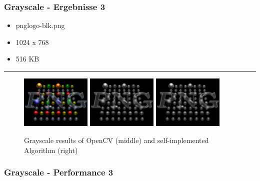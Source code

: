 \begin{frame}
    \frametitle{Grayscale - Ergebnisse 3}

    \begin{itemize}
        \item pnglogo-blk.png
        \item 1024 x 768
        \item 516 KB
    \end{itemize}

    \hfill
    \hrule
    \hfill

    \begin{figure}[H]
        \centering
    
        \includegraphics[width=0.30\textwidth]{images/pnglogo-blk.png}
        \includegraphics[width=0.30\textwidth]{images/results/grayscale-cv.pnglogo-blk.png}
        \includegraphics[width=0.30\textwidth]{images/results/grayscale-my.pnglogo-blk.png}

        
        \begin{center}
            \caption{Grayscale results of OpenCV (middle) and self-implemented  Algorithm (right)}            
        \end{center}

        \label{fig:grayscale3}
    \end{figure}
\end{frame}

\begin{frame}
    \frametitle{Grayscale - Performance 3}

    

\end{frame}